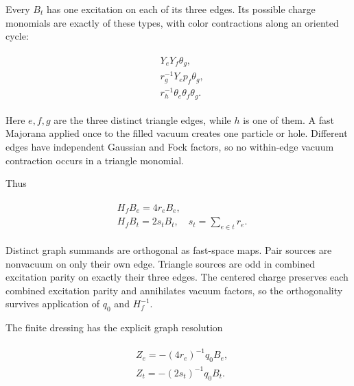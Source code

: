 Every \(B_{t}\) has one excitation on each of its three edges. Its
possible charge monomials are exactly of these types, with color
contractions along an oriented cycle:

\begin{gather*}
\begin{aligned}
& Y_{e} Y_{f} \theta _{g}, \\
& r_{g}^{-1} Y_{e} p_{f} \theta _{g}, \\
& r_{h}^{-1} \theta _{e} \theta _{f} \theta _{g}.
\end{aligned}\tag{4.2}
\end{gather*}

Here \(e,f,g\) are the three distinct triangle edges, while \(h\) is one
of them. A fast Majorana applied once to the filled vacuum creates one
particle or hole. Different edges have independent Gaussian and Fock
factors, so no within-edge vacuum contraction occurs in a triangle
monomial.

Thus

\begin{gather*}
\begin{aligned}
& H_{f} B_{e} = 4r_{e} B_{e}, \\
& H_{f} B_{t} = 2s_{t} B_{t}, \quad  s_{t}=\sum _{e \in  t} r_{e}.
\end{aligned}\tag{4.3}
\end{gather*}

Distinct graph summands are orthogonal as fast-space maps. Pair sources
are nonvacuum on only their own edge. Triangle sources are odd in
combined excitation parity on exactly their three edges. The centered
charge preserves each combined excitation parity and annihilates vacuum
factors, so the orthogonality survives application of \(q_{0}\) and
\(H_{f}^{-1}\).

The finite dressing has the explicit graph resolution

\begin{gather*}
\begin{aligned}
& Z_{e} = -(4r_{e})^{-1} q_{0} B_{e}, \\
& Z_{t} = -(2s_{t})^{-1} q_{0} B_{t}.
\end{aligned}\tag{4.4}
\end{gather*}


